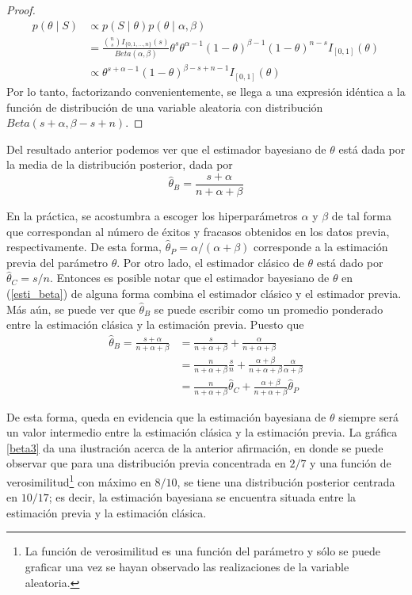 \documentclass[10pt,openright]{book}\usepackage[]{graphicx}\usepackage[]{color}
\begin{document}
    \begin{proof}
    \begin{align*}
    p(\theta \mid S)&\propto p(S \mid \theta)p(\theta \mid \alpha,\beta)\\
    &=\frac{\binom{n}{s}I_{\{0,1,\ldots,n\}}(s)}{Beta(\alpha,\beta)}
    \theta^s\theta^{\alpha-1} (1-\theta)^{\beta-1}(1-\theta)^{n-s}I_{[0,1]}(\theta)\\
    &\propto \theta^{s+\alpha-1} (1-\theta)^{\beta-s+n-1}I_{[0,1]}(\theta)
    \end{align*}
    Por lo tanto, factorizando convenientemente, se llega a una expresi\'on id\'entica a la funci\'on de distribuci\'on de una variable aleatoria con distribuci\'on $Beta(s+\alpha,\beta-s+n)$.
    
    \end{proof}
    
    Del resultado anterior podemos ver que el estimador bayesiano de $\theta$ est\'a dada por la media de la distribuci\'on posterior, dada por
    \begin{equation}\label{esti_beta}
    \hat{\theta}_{B}=\frac{s+\alpha}{n+\alpha+\beta}
    \end{equation}
    
    En la pr\'actica, se acostumbra a escoger los hiperpar\'ametros $\alpha$ y $\beta$ de tal forma que correspondan al n\'umero de \'exitos y fracasos obtenidos en los datos previa, respectivamente. De esta forma, $\hat{\theta}_{P}=\alpha/(\alpha+\beta)$ corresponde a la estimaci\'on previa del par\'ametro $\theta$. Por otro lado, el estimador cl\'asico de $\theta$ est\'a dado por $\hat{\theta}_{C}=s/n$. Entonces es posible notar que el estimador bayesiano de $\theta$ en (\ref{esti_beta}) de alguna forma combina el estimador cl\'asico y el estimador previa. M\'as a\'un, se puede ver que $\hat{\theta}_{B}$ se puede escribir como un promedio ponderado entre la estimaci\'on cl\'asica y la estimaci\'on previa. Puesto que
    \begin{align*}
    \hat{\theta}_{B}=\frac{s+\alpha}{n+\alpha+\beta}&=\frac{s}{n+\alpha+\beta}+\frac{\alpha}{n+\alpha+\beta}\\
    &=\frac{n}{n+\alpha+\beta}\frac{s}{n}+\frac{\alpha+\beta}{n+\alpha+\beta}\frac{\alpha}{\alpha+\beta}\\
    &=\frac{n}{n+\alpha+\beta}\hat{\theta}_{C}+\frac{\alpha+\beta}{n+\alpha+\beta}\hat{\theta}_{P}
    \end{align*}
    
    De esta forma, queda en evidencia que la estimaci\'on bayesiana de $\theta$ siempre ser\'a un valor intermedio entre la estimaci\'on cl\'asica y la estimaci\'on previa. La gr\'afica \ref{beta3} da una ilustraci\'on acerca de la anterior afirmaci\'on, en donde se puede observar que para una distribuci\'on previa concentrada en $2/7$ y una funci\'on de verosimilitud\footnote{La funci\'on de verosimilitud es una funci\'on del par\'ametro y s\'olo se puede graficar una vez se hayan observado las realizaciones de la variable aleatoria.} con m\'aximo en $8/10$, se tiene una distribuci\'on posterior centrada en $10/17$; es decir, la estimaci\'on bayesiana se encuentra situada entre la estimaci\'on previa y la estimaci\'on cl\'asica.
    
\end{document}
